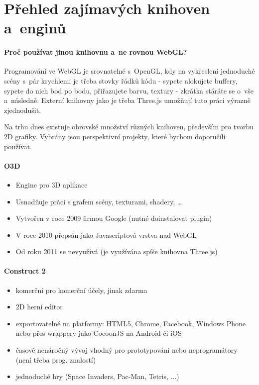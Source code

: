 \documentclass[12pt,a4paper,titlepage,final]{report}
\begin{document}
\section{Přehled zajímavých knihoven a~enginů}

\paragraph{Proč používat jinou knihovnu a~ne rovnou WebGL?} Programování ve WebGL je srovnatelné s~OpenGL, kdy na vykreslení jednoduché scény s~pár krychlemi je třeba stovky řádků kódu - sypete alokujete buffery, sypete do nich bod po bodu, přiřazujete barvu, textury - zkrátka stáráte se o~vše a~následně. Externí knihovny jako je třeba Three.js umožňují tuto práci výrazně zjednodušit.

Na trhu dnes existuje obrovské množství různých knihoven, především pro tvorbu 2D grafiky. Vybrány jsou perspektivní projekty, které bychom doporučili používat.

\paragraph{O3D}

\begin{itemize}
	\item Engine pro 3D aplikace
	\item Usnadňuje práci s grafem scény, texturami, shadery, \dots	
	\item Vytvořen v roce 2009 firmou Google (nutné doinstalovat plugin)
	\item V roce 2010 přepsán jako Javascriptová vrstva nad WebGL
	\item Od roku 2011 se nevyužívá (je využívána spíše knihovna Three.js)
\end{itemize}

\paragraph{Construct 2}  \cite{construct2}

\begin{itemize}
	\item komerční pro komerční účely, jinak zdarma
	\item 2D herní editor
	\item exportovatelné na platformy: HTML5, Chrome, Facebook, Windows Phone nebo přes wrappery jako CocoonJS na Android či iOS
	\item časově nenáročný vývoj vhodný pro prototypování nebo neprogramátory (není třeba prog. znalostí)
	\item jednoduché hry (Space Invaders, Pac-Man, Tetris, ...)
\end{itemize}
\end{document}
